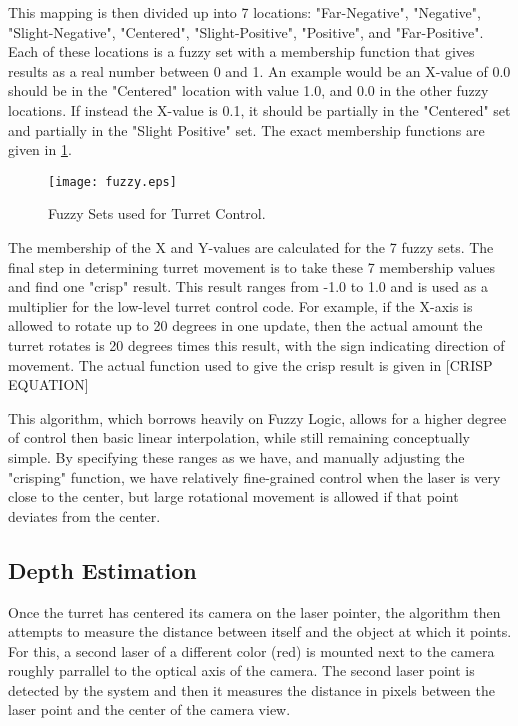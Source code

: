 \documentclass[10pt,twocolumn,letterpaper]{article}
\begin{document}
This mapping is then divided up into 7 locations:  "Far-Negative", "Negative", "Slight-Negative", "Centered", "Slight-Positive", "Positive", and "Far-Positive". Each of these locations is a fuzzy set with a membership function that gives results as a real number between 0 and 1. An example would be an X-value of 0.0 should be in the "Centered" location with value 1.0, and 0.0 in the other fuzzy locations. If instead the X-value is 0.1, it should be partially in the "Centered" set and partially in the "Slight Positive" set. The exact membership functions are given in \ref{fig:fuzzy}.

\begin{figure}[t]
\begin{center}
  \texttt{[image: fuzzy.eps]}
\end{center}
   \caption{Fuzzy Sets used for Turret Control.}
\label{fig:fuzzy}
\end{figure}

The membership of the X and Y-values are calculated for the 7 fuzzy sets. The final step in determining turret movement is to take these 7 membership values and find one "crisp" result. This result ranges from -1.0 to 1.0 and is used as a multiplier for the low-level turret control code. For example, if the X-axis is allowed to rotate up to 20 degrees in one update, then the actual amount the turret rotates is 20 degrees times this result, with the sign indicating direction of movement. The actual function used to give the crisp result is given in [CRISP EQUATION]

This algorithm, which borrows heavily on Fuzzy Logic, allows for a higher degree of control then basic linear interpolation, while still remaining conceptually simple. By specifying these ranges as we have, and manually adjusting the "crisping" function, we have relatively fine-grained control when the laser is very close to the center, but large rotational movement is allowed if that point deviates from the center.

\subsection{Depth Estimation}

Once the turret has centered its camera on the laser pointer, the algorithm then attempts to measure the distance between itself and the object at which it points.  For this, a second laser of a different color (red) is mounted next to the camera roughly parrallel to the optical axis of the camera.  The second laser point is detected by the system and then it measures the distance in pixels between the laser point and the center of the camera view. 
\end{document}
